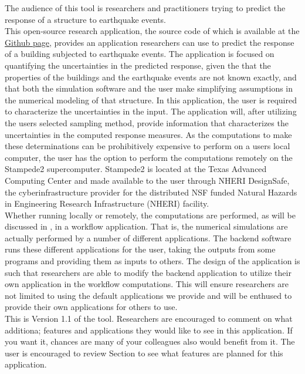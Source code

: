 The audience of this tool is researchers and practitioners trying to
predict the response of a structure to earthquake events.\\

This open-source research application, the source code of which is
available at the \href{https://github.com/NHERI-SimCenter/EE-UQ}{\texttt{\getsoftwarename{}}
Github page}, provides an application researchers can use to predict
the response of a building subjected to earthquake events. The
application is focused on quantifying the uncertainties in the
predicted response, given the that the properties of the buildings and
the earthquake events are not known exactly, and that both the
simulation software and the user make simplifying assumptions in the
numerical modeling of that structure. In this application, the user is
required to characterize the uncertainties in the input. The
application will, after utilizing the users selected sampling method,
provide information that characterizes the uncertainties in the
computed response measures. As the computations to make these
determinations can be prohibitively expensive to perform on a users
local computer, the user has the option to perform the computations
remotely on the Stampede2 supercomputer. Stampede2 is located at the
Texas Advanced Computing Center and made available to the user through
NHERI DesignSafe, the cyberinfrastructure provider for the distributed
NSF funded Natural Hazards in Engineering Research Infrastructure
(NHERI) facility.\\

Whether running locally or remotely, the computations are performed,
as will be discussed in , in a workflow
application. That is, the numerical simulations are actually performed
by a number of different applications. The \texttt{\getsoftwarename{}} backend software runs
these different applications for the user, taking the outputs from
some programs and providing them as inputs to others. The design of
the \texttt{\getsoftwarename{}} application is such that researchers are able to modify the
backend application to utilize their own application in the workflow
computations. This will ensure researchers are not limited to using
the default applications we provide and will be enthused to provide
their own applications for others to use. \\

This is Version 1.1 of the tool. Researchers are encouraged to comment
on what additiona; features and applications they would like to see in
this application. If you want it, chances are many of your colleagues
also would benefit from it. The user is encouraged to review
Section  to see what features are planned for this
application.
